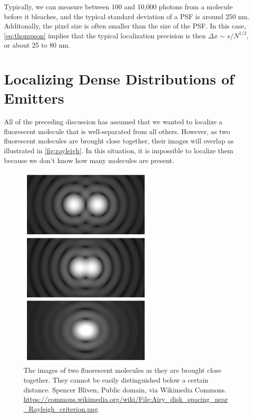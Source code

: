 \documentclass[10pt,a4paper]{book}
\begin{document}
Typically, we can measure between 100 and 10,000 photons from a molecule before it bleaches, and the typical standard deviation of a PSF is around 250 nm. Additonally, the pixel size is often smaller than the size of the PSF. In this case, \ref{eq:thompson} implies that the typical localization precision is then $\Delta x \sim s / N^{1/2}$, or about 25 to 80 nm.

\section{Localizing Dense Distributions of Emitters}

All of the preceding discussion has assumed that we wanted to localize a fluorescent molecule that is well-separated from all others. However, as two fluorescent molecules are brought close together, their images will overlap as illustrated in \autoref{fig:rayleigh}. In this situation, it is impossible to localize them because we don't know how many molecules are present.

\begin{figure}[ht]
    \centering
    \includegraphics[width=0.6\textwidth]{Airy_disk_spacing_near_Rayleigh_criterion.png}
    \caption{The images of two fluorescent molecules as they are brought close together. They cannot be easily distinguished below a certain distance. Spencer Bliven, Public domain, via Wikimedia Commons. \url{https://commons.wikimedia.org/wiki/File:Airy_disk_spacing_near_Rayleigh_criterion.png}}
    \label{fig:rayleigh}
\end{figure}
\end{document}
